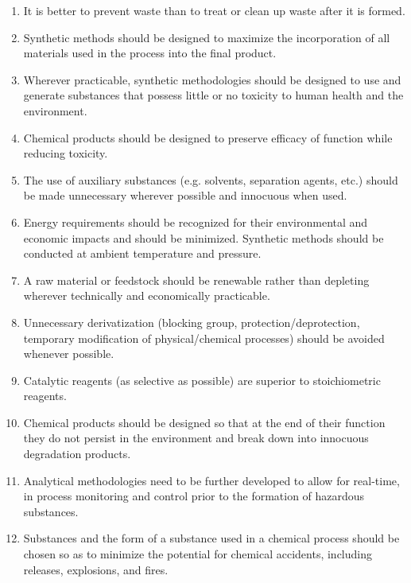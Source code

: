 \begin{enumerate}
  \item It is better to prevent waste than to treat or clean up waste after it is formed.
  
  \item Synthetic methods should be designed to maximize the incorporation of
  all materials used in the process into the final product.
  
  \item Wherever practicable, synthetic methodologies should be designed to use
  and generate substances that possess little or no toxicity to human health and
  the environment.
  
  \item Chemical products should be designed to preserve efficacy of function
  while reducing toxicity.
  
  \item The use of auxiliary substances (e.g. solvents, separation agents, etc.)
  should be made unnecessary wherever possible and innocuous when used.
  
  \item Energy requirements should be recognized for their environmental and
  economic impacts and should be minimized. Synthetic methods should be
  conducted at ambient temperature and pressure.
  
  \item \label{itm:renewable}A raw material or feedstock should be renewable
  rather than depleting wherever technically and economically practicable.
  
  \item Unnecessary derivatization (blocking group, protection/deprotection,
  temporary modification of physical/chemical processes) should be avoided
  whenever possible.
  
  \item Catalytic reagents (as selective as possible) are superior to
  stoichiometric reagents.
  
  \item Chemical products should be designed so that at the end of their
  function they do not persist in the environment and break down into innocuous
  degradation products.
  
  \item Analytical methodologies need to be further developed to allow for
  real-time, in process monitoring and control prior to the formation of
  hazardous substances.
  
  \item Substances and the form of a substance used in a chemical process should
  be chosen so as to minimize the potential for chemical accidents, including
  releases, explosions, and fires.

\end{enumerate}

